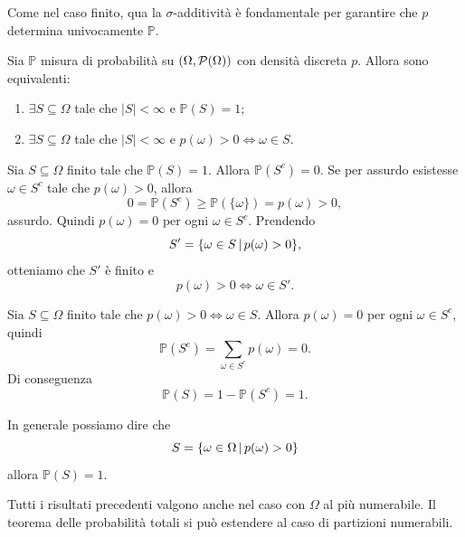 \documentclass[a4paper]{article}
\begin{document}
Come nel caso finito, qua la \(\sigma\)-additività è fondamentale per garantire che \(p\)
determina univocamente \(\mathbb P\).

\begin{snippetcorollary}{}
    Sia \(\mathbb P\) misura di probabilità su \((\Omega, \mathcal P(\Omega))\) con densità discreta \(p\).
    Allora sono equivalenti:
    \begin{enumerate}
        \item \(\exists S \subseteq \Omega\) tale che \(|S| < \infty\) e \(\mathbb P(S) = 1\);
        \item \(\exists S \subseteq \Omega\) tale che \(|S| < \infty\) e \(p(\omega) > 0 \iff \omega \in S\).
    \end{enumerate}
\end{snippetcorollary}

\begin{snippetproof}{}
    \begin{iffproof}
    \item Sia \(S \subseteq \Omega\) finito tale che \(\mathbb P(S)=1\).
        Allora \(\mathbb P(S^c)=0\).
        Se per assurdo esistesse \(\omega \in S^c\) tale che \(p(\omega)>0\),
        allora
        \[
            0 = \mathbb P(S^c) \geq \mathbb P(\{\omega\}) = p(\omega) > 0,
        \]
        assurdo.
        Quindi \(p(\omega)=0\) per ogni \(\omega \in S^c\).
        Prendendo
        \[
            S' = \{\omega \in S \,|\, p(\omega)>0\},
        \]
        otteniamo che \(S'\) è finito e
        \[
            p(\omega)>0 \iff \omega \in S'.
        \]

    \item Sia \(S \subseteq \Omega\) finito tale che
        \(p(\omega)>0 \iff \omega \in S\).
        Allora \(p(\omega)=0\) per ogni \(\omega \in S^c\), quindi
        \[
            \mathbb P(S^c)
            = \sum_{\omega \in S^c} p(\omega)
            = 0.
        \]
        Di conseguenza
        \[
            \mathbb P(S) = 1 - \mathbb P(S^c) = 1.
        \]
    \end{iffproof}
\end{snippetproof}

In generale possiamo dire che \[
    S = \{
        \omega \in \Omega \,|\, p(\omega) > 0
    \}
\]
allora \(\mathbb P(S) = 1\).

Tutti i risultati precedenti valgono anche nel caso con \(\Omega\)
al più numerabile.
Il teorema delle probabilità totali si può estendere al caso di partizioni numerabili.
\end{document}
